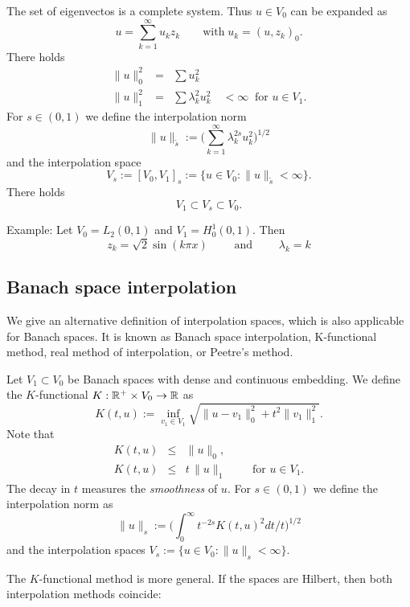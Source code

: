 The set of eigenvectos is a complete system. Thus $u \in V_0$ can be 
expanded as
$$
u = \sum_{k=1}^\infty u_k z_k \qquad \text{with} \; u_k = (u, z_k)_0.
$$
There holds
\begin{eqnarray*}
\| u \|_0^2 & = & \sum u_k^2 \\
\| u \|_1^2 & = & \sum \lambda_k^2 u_k^2  \quad < \infty \; \; \text{for } u \in V_1.
\end{eqnarray*}
For $s \in (0,1)$ we define the interpolation norm
\begin{equation}
\| u \|_{\tilde s} := \Big( \sum_{k=1}^\infty \lambda_k^{2s} u_k^2 \Big)^{1/2}
\end{equation}
and the interpolation space
$$
V_s := [V_0,V_1]_s := \{ u \in V_0 : \| u \|_{\tilde s} < \infty \}.
$$
There holds
$$
V_1 \subset V_s \subset V_0.
$$

{Example:} Let $V_0 = L_2(0,1)$ and $V_1 = H_0^1(0,1)$. Then
$$
z_k = \sqrt{2}\sin (k\pi x) \qquad \text{ and } \qquad \lambda_k = k
$$

\subsection{Banach space interpolation}
We give an alternative definition of interpolation spaces, which is also applicable for Banach spaces. It is known as Banach space interpolation, K-functional method, real method of interpolation, or Peetre's method. 

Let $V_1 \subset V_0$ be Banach spaces with dense and continuous embedding. We 
define the $K$-functional $K : {\mathbb R}^+ \times V_0 \rightarrow {\mathbb R}$ as
$$
K(t,u) := \inf_{v_1 \in V_1}  \sqrt{ \| u - v_1 \|_0^2 + t^2 \| v_1 \|_1^2}.
$$
Note that
\begin{eqnarray*} 
K(t,u) & \leq & \| u \|_0, \\
K(t,u) & \leq & t \, \| u \|_1 \qquad \text{ for } u \in V_1.
\end{eqnarray*}
The decay in $t$ measures the {\it smoothness} of $u$. For $s \in (0,1)$ we define
the interpolation norm as
\begin{equation}
\| u \|_s := \Big(  \int_0^\infty t^{-2s} K(t,u)^2 dt/t \Big)^{1/2}
\end{equation}
and the interpolation spaces $V_s := \{ u \in V_0 : \| u \|_s < \infty \}$.


The $K$-functional method is more general. If the spaces are Hilbert, then both
interpolation methods coincide:

